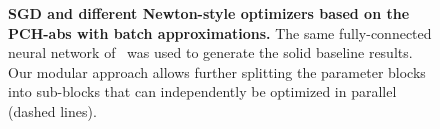 \begin{figure}[!t]
  \centering
  \footnotesize
  \begin{minipage}{0.495\linewidth}
    \centering
    \vspace*{-2.5ex}
    \setlength{\figwidth}{1.08\linewidth}
    \setlength{\figheight}{0.66\figwidth}
    \HBPresetPGFStyle
    \tikzexternalenable
    
    \tikzexternaldisable
  \end{minipage}
  \hfill
  \begin{minipage}{0.495\linewidth}
    \centering
    \setlength{\figwidth}{1.08\linewidth}
    \setlength{\figheight}{0.66\figwidth}
    \HBPresetPGFStyle
    \tikzexternalenable
    
    \tikzexternaldisable
  \end{minipage}
  \vspace{-3ex}
  \caption{\textbf{SGD and different Newton-style optimizers based on the
      PCH-abs with batch approximations.} The same fully-connected neural
    network of~\citep{wei2018bdapch} was used to generate the solid baseline
    results. Our modular approach allows further splitting the parameter blocks
    into sub-blocks that can independently be optimized in parallel (dashed
    lines).}
  \label{hbp::fig:experiment_fcnn}
\end{figure}


